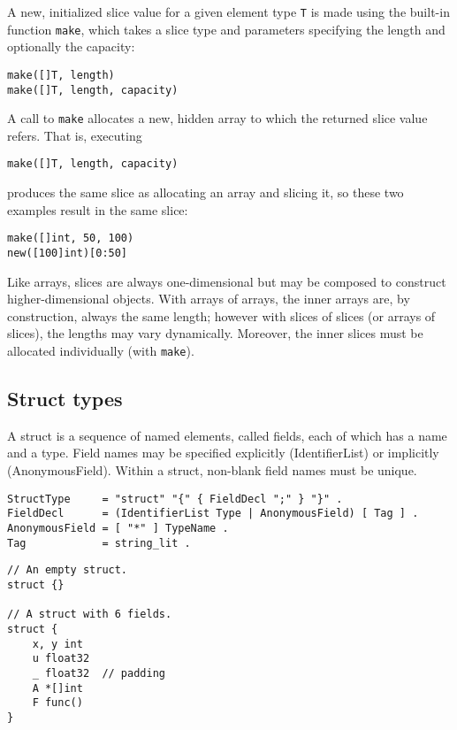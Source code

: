A new, initialized slice value for a given element type \texttt{T} is
made using the built-in function
\texttt{make}, which
takes a slice type and parameters specifying the length and optionally
the capacity:

\begin{Verbatim}[frame=single]
make([]T, length)
make([]T, length, capacity)
\end{Verbatim}

A call to \texttt{make} allocates a new, hidden array to which the
returned slice value refers. That is, executing

\begin{Verbatim}[frame=single]
make([]T, length, capacity)
\end{Verbatim}

produces the same slice as allocating an array and slicing it, so these
two examples result in the same slice:

\begin{Verbatim}[frame=single]
make([]int, 50, 100)
new([100]int)[0:50]
\end{Verbatim}

Like arrays, slices are always one-dimensional but may be composed to
construct higher-dimensional objects. With arrays of arrays, the inner
arrays are, by construction, always the same length; however with slices
of slices (or arrays of slices), the lengths may vary dynamically.
Moreover, the inner slices must be allocated individually (with
\texttt{make}).

\subsection*{Struct types}

A struct is a sequence of named elements, called fields, each of which
has a name and a type. Field names may be specified explicitly
(IdentifierList) or implicitly (AnonymousField). Within a struct,
non-blank field names must be
unique.

\begin{Verbatim}[frame=single]
StructType     = "struct" "{" { FieldDecl ";" } "}" .
FieldDecl      = (IdentifierList Type | AnonymousField) [ Tag ] .
AnonymousField = [ "*" ] TypeName .
Tag            = string_lit .
\end{Verbatim}

\begin{Verbatim}[frame=single]
// An empty struct.
struct {}

// A struct with 6 fields.
struct {
    x, y int
    u float32
    _ float32  // padding
    A *[]int
    F func()
}
\end{Verbatim}

